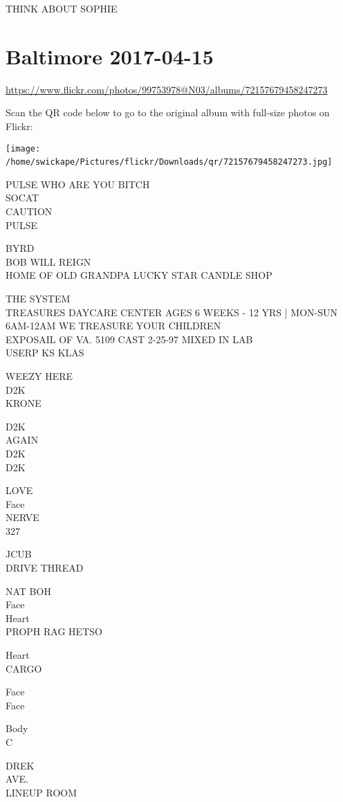 \documentclass[10pt,letterpaper]{article}
\begin{document}
THINK ABOUT SOPHIE
\

\section*{Baltimore 2017-04-15}

\url{https://www.flickr.com/photos/99753978@N03/albums/72157679458247273}

Scan the QR code below to go to the original album with full-size photos on Flickr:

\texttt{[image: /home/swickape/Pictures/flickr/Downloads/qr/72157679458247273.jpg]}
\

PULSE WHO ARE YOU BITCH\\
SOCAT\\
CAUTION\\
PULSE

BYRD\\
BOB WILL REIGN\\
HOME OF OLD GRANDPA LUCKY STAR CANDLE SHOP

THE SYSTEM\\
TREASURES DAYCARE CENTER AGES 6 WEEKS {-} 12 YRS | MON{-}SUN 6AM{-}12AM WE TREASURE YOUR CHILDREN\\
EXPOSAIL OF VA. 5109 CAST 2{-}25{-}97 MIXED IN LAB\\
USERP KS KLAS

WEEZY HERE\\
D2K\\
KRONE

D2K\\
AGAIN\\
D2K\\
D2K

LOVE\\
Face\\
NERVE\\
327

JCUB\\
DRIVE THREAD

NAT BOH\\
Face\\
Heart\\
PROPH RAG HETSO

Heart\\
CARGO

Face\\
Face

Body\\
C

DREK\\
AVE.\\
LINEUP ROOM
\end{document}
